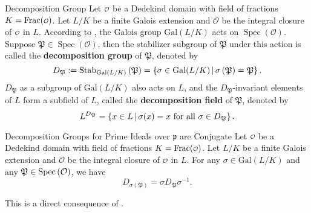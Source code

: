 \begin{definition}{Decomposition Group}{}
    Let $\mathcalo$ be a Dedekind domain with field of fractions $K=\mathrm{Frac}(\mathcalo)$. Let $L/K$ be a finite Galois extension and $\mathcal{O}$ be the integral closure of $\mathcalo$ in $L$. According to , the Galois group $\mathrm{Gal}(L/K)$ acts on $\operatorname{Spec}\left(\mathcal{O}\right)$. Suppose $\mathfrak{P}\in \operatorname{Spec}\left(\mathcal{O}\right)$, then the stabilizer subgroup of $\mathfrak{P}$ under this action is called the \textbf{decomposition group} of $\mathfrak{P}$, denoted by
    \[
    D_{\mathfrak{P}}:=\mathrm{Stab}_{\mathrm{Gal}(L/K)}\left(\mathfrak{P}\right)=\left\{ \sigma\in \mathrm{Gal}(L/K)\,\middle\vert\, \sigma\left(\mathfrak{P}\right)=\mathfrak{P}\right\}.
    \] 
    $D_{\mathfrak{P}}$ as a subgroup of $\mathrm{Gal}(L/K)$ also acts on $L$, and the $D_{\mathfrak{P}}$-invariant elements of $L$ form a subfield of $L$, called the \textbf{decomposition field} of $\mathfrak{P}$, denoted by 
    \[
    L^{D_{\mathfrak{P}}}=\left\{ x\in L\,\middle\vert\, \sigma(x)=x\text{ for all }\sigma\in D_{\mathfrak{P}}\right\}.
    \]
\end{definition}

\begin{proposition}{Decomposition Groups for Prime Ideals over $\mathfrak{p}$ are Conjugate}{}
    Let $\mathcalo$ be a Dedekind domain with field of fractions $K=\mathrm{Frac}(\mathcalo)$. Let $L/K$ be a finite Galois extension and $\mathcal{O}$ be the integral closure of $\mathcalo$ in $L$. For any $\sigma\in \mathrm{Gal}(L/K)$ and any $\mathfrak{P}\in\operatorname{Spec}\left(\mathcal{O}\right)$, we have
    \[
    D_{\sigma\left(\mathfrak{P}\right)}=\sigma D_{\mathfrak{P}}\sigma^{-1}.
    \]
\end{proposition}
\begin{prf}
    This is a direct consequence of .
\end{prf}


